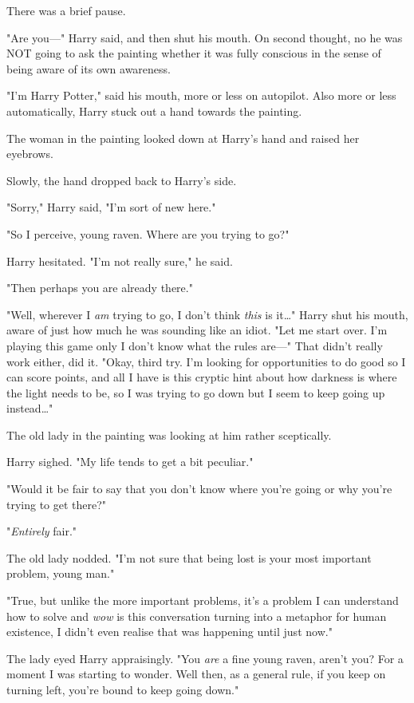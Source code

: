 There was a brief pause.

"Are you---" Harry said, and then shut his mouth. On second thought, no he was 
NOT going to ask the painting whether it was fully conscious in the sense of 
being aware of its own awareness.

"I'm Harry Potter," said his mouth, more or less on autopilot. Also more or 
less automatically, Harry stuck out a hand towards the painting.

The woman in the painting looked down at Harry's hand and raised her eyebrows.

Slowly, the hand dropped back to Harry's side.

"Sorry," Harry said, "I'm sort of new here."

"So I perceive, young raven. Where are you trying to go?"

Harry hesitated. "I'm not really sure," he said.

"Then perhaps you are already there."

"Well, wherever I \emph{am} trying to go, I don't think \emph{this} is 
it{\ldots}" Harry shut his mouth, aware of just how much he was sounding like 
an idiot. "Let me start over. I'm playing this game only I don't know what the 
rules are---" That didn't really work either, did it. "Okay, third try. I'm 
looking for opportunities to do good so I can score points, and all I have is 
this cryptic hint about how darkness is where the light needs to be, so I was 
trying to go down but I seem to keep going up instead{\ldots}"

The old lady in the painting was looking at him rather sceptically.

Harry sighed. "My life tends to get a bit peculiar."

"Would it be fair to say that you don't know where you're going or why you're 
trying to get there?"

"\emph{Entirely} fair."

The old lady nodded. "I'm not sure that being lost is your most important 
problem, young man."

"True, but unlike the more important problems, it's a problem I can understand 
how to solve and \emph{wow} is this conversation turning into a metaphor for 
human existence, I didn't even realise that was happening until just now."

The lady eyed Harry appraisingly. "You \emph{are} a fine young raven, aren't 
you? For a moment I was starting to wonder. Well then, as a general rule, if 
you keep on turning left, you're bound to keep going down."

